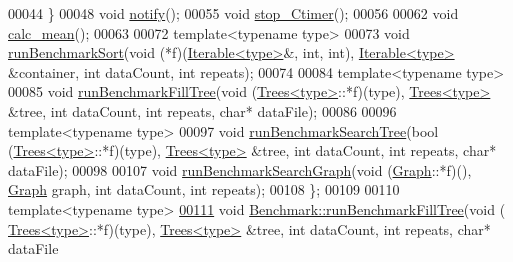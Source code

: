 \begin{DoxyCode}
00044   \}
00048   \textcolor{keywordtype}{void} \hyperlink{class_benchmark_a408a44a1d64e45b647ef6dbba2f2c3d3}{notify}();
00055   \textcolor{keywordtype}{void} \hyperlink{class_benchmark_ab65889d4c2df3eb503048ab1cc6e7413}{stop\_Ctimer}();
00056 
00062   \textcolor{keywordtype}{void} \hyperlink{class_benchmark_ac4d5360d2850510913efe07cf957f4c1}{calc\_mean}();
00063 
00072   \textcolor{keyword}{template}<\textcolor{keyword}{typename} type>
00073   \textcolor{keywordtype}{void} \hyperlink{class_benchmark_ad5d8a563d9b9163758ae04d064cc38cb}{runBenchmarkSort}(\textcolor{keywordtype}{void} (*f)(\hyperlink{class_iterable}{Iterable<type>}&, \textcolor{keywordtype}{int}, \textcolor{keywordtype}{int}), 
      \hyperlink{class_iterable}{Iterable<type>} &container, \textcolor{keywordtype}{int} dataCount, \textcolor{keywordtype}{int} repeats);
00074 
00084   \textcolor{keyword}{template}<\textcolor{keyword}{typename} type>
00085   \textcolor{keywordtype}{void} \hyperlink{class_benchmark_ac0795fc9eae36d523dde2fe06ea10fc0}{runBenchmarkFillTree}(\textcolor{keywordtype}{void} (\hyperlink{class_trees}{Trees<type>}::*f)(type), 
      \hyperlink{class_trees}{Trees<type>} &tree, \textcolor{keywordtype}{int} dataCount, \textcolor{keywordtype}{int} repeats, \textcolor{keywordtype}{char}* dataFile);
00086 
00096   \textcolor{keyword}{template}<\textcolor{keyword}{typename} type>
00097   \textcolor{keywordtype}{void} \hyperlink{class_benchmark_a9e6b5ef8df351452be5fa0c8d127367a}{runBenchmarkSearchTree}(\textcolor{keywordtype}{bool} (\hyperlink{class_trees}{Trees<type>}::*f)(type), 
      \hyperlink{class_trees}{Trees<type>} &tree, \textcolor{keywordtype}{int} dataCount, \textcolor{keywordtype}{int} repeats, \textcolor{keywordtype}{char}* dataFile);
00098 
00107   \textcolor{keywordtype}{void} \hyperlink{class_benchmark_ae9e23e7f4cf294fad57f5c98298bf874}{runBenchmarkSearchGraph}(\textcolor{keywordtype}{void} (\hyperlink{class_graph}{Graph}::*f)(), 
      \hyperlink{class_graph}{Graph} graph, \textcolor{keywordtype}{int} dataCount, \textcolor{keywordtype}{int} repeats);
00108 \};
00109 
00110 \textcolor{keyword}{template}<\textcolor{keyword}{typename} type>
\hypertarget{benchmark_8hh_source_l00111}{}\hyperlink{class_benchmark_ac0795fc9eae36d523dde2fe06ea10fc0}{00111} \textcolor{keywordtype}{void} \hyperlink{class_benchmark_ac0795fc9eae36d523dde2fe06ea10fc0}{Benchmark::runBenchmarkFillTree}(\textcolor{keywordtype}{void} (
      \hyperlink{class_trees}{Trees<type>}::*f)(type), \hyperlink{class_trees}{Trees<type>} &tree, \textcolor{keywordtype}{int} dataCount, \textcolor{keywordtype}{int} repeats, \textcolor{keywordtype}{char}* dataFile

\end{DoxyCode}
